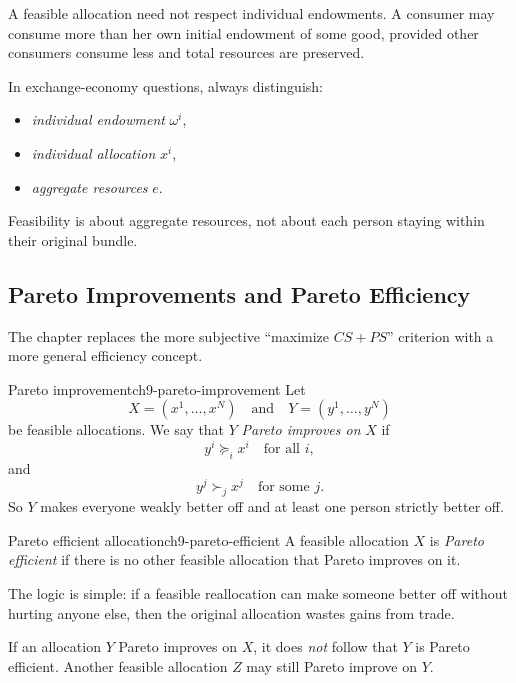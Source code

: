 A feasible allocation need not respect individual endowments. A consumer may consume more than her own initial endowment of some good, provided other consumers consume less and total resources are preserved.

\begin{examtip}
In exchange-economy questions, always distinguish:
\begin{itemize}
    \item \emph{individual endowment} $\omega^i$,
    \item \emph{individual allocation} $x^i$,
    \item \emph{aggregate resources} $e$.
\end{itemize}
Feasibility is about aggregate resources, not about each person staying within their original bundle.
\end{examtip}

\subsection{Pareto Improvements and Pareto Efficiency}

The chapter replaces the more subjective ``maximize $CS+PS$'' criterion with a more general efficiency concept.

\begin{definition}{Pareto improvement}{ch9-pareto-improvement}
Let
\[
X=(x^1,\dots,x^N)
\quad \text{and} \quad
Y=(y^1,\dots,y^N)
\]
be feasible allocations. We say that $Y$ \emph{Pareto improves on} $X$ if
\[
y^i \succeq_i x^i
\quad \text{for all } i,
\]
and
\[
y^j \succ_j x^j
\quad \text{for some } j.
\]
So $Y$ makes everyone weakly better off and at least one person strictly better off.
\end{definition}

\begin{definition}{Pareto efficient allocation}{ch9-pareto-efficient}
A feasible allocation $X$ is \emph{Pareto efficient} if there is no other feasible allocation that Pareto improves on it.
\end{definition}

The logic is simple: if a feasible reallocation can make someone better off without hurting anyone else, then the original allocation wastes gains from trade.

\begin{commonmistake}
If an allocation $Y$ Pareto improves on $X$, it does \emph{not} follow that $Y$ is Pareto efficient. Another feasible allocation $Z$ may still Pareto improve on $Y$.
\end{commonmistake}

